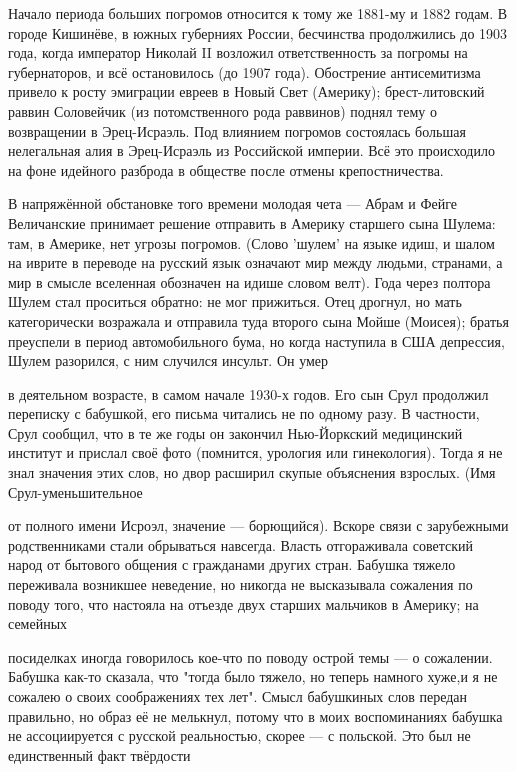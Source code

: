 \label{126-1}
Начало периода больших погромов относится к тому же 1881-му и 1882 годам. В городе Кишинёве, в южных губерниях России, бесчинства продолжились до 1903 года, когда император Николай II возложил ответственность за погромы на губернаторов, и всё остановилось (до 1907 года). Обострение антисемитизма привело к росту эмиграции евреев в Новый Свет (Америку); брест-литовский раввин Соловейчик (из потомственного рода раввинов) поднял тему о возвращении в Эрец-Исраэль. Под влиянием погромов состоялась большая нелегальная алия в Эрец-Исраэль из Российской империи. Всё это происходило на фоне идейного разброда в обществе после отмены крепостничества.

\label{127-1}
В напряжённой обстановке того времени молодая чета — Абрам и Фейге Величанские принимает решение отправить в Америку старшего сына Шулема: там, в Америке, нет угрозы погромов. (Слово 'шулем' на языке идиш, и шалом на иврите в переводе на русский язык означают мир между людьми, странами, а мир в смысле вселенная обозначен на идише словом велт). Года через полтора Шулем стал проситься обратно: не мог прижиться. Отец дрогнул, но мать категорически возражала и отправила туда второго сына Мойше (Моисея); братья преуспели в период автомобильного бума, но когда наступила в США депрессия, Шулем разорился, с ним случился инсульт. Он умер

\label{128-1}
в деятельном возрасте, в самом начале 1930-х годов. Его сын Срул продолжил переписку с бабушкой, его письма читались не по одному разу. В частности, Срул сообщил, что в те же годы он закончил Нью-Йоркский медицинский институт и прислал своё фото (помнится, урология или гинекология). Тогда я не знал значения этих слов, но двор расширил скупые объяснения взрослых. (Имя Срул-уменьшительное 

\label{129-1}
от полного имени Исроэл, значение — борющийся). Вскоре связи с зарубежными родственниками стали обрываться навсегда. Власть отгораживала советский народ от бытового общения с гражданами других стран. Бабушка тяжело переживала возникшее неведение, но никогда не высказывала сожаления по поводу того, что настояла на отъезде двух старших мальчиков в Америку; на семейных

\label{130-1}
посиделках иногда говорилось кое-что по поводу острой темы — о сожалении. Бабушка как-то сказала, что "тогда было тяжело, но теперь намного хуже,и я не сожалею о своих соображениях тех лет". Смысл бабушкиных слов передан правильно, но образ её не мелькнул, потому что в моих воспоминаниях бабушка не ассоциируется с русской реальностью, скорее — с польской. Это был не единственный факт твёрдости 

